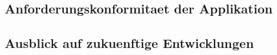 \documentclass[../main.tex]{subfiles}
\begin{document}
\subsection{Anforderungskonformitaet der Applikation}
\subsection{Ausblick auf zukuenftige Entwicklungen}
\end{document}
